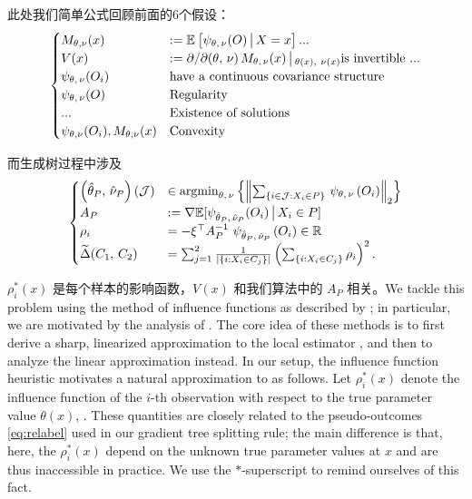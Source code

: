 \documentclass[aos]{imsart}
\theoremstyle{plain}
\theoremstyle{definition}
\theoremstyle{remark}
\begin{document}
\begin{CJK}{UTF8}{gbsn}
此处我们简单公式回顾前面的6个假设：
\begin{equation*}
\begin{cases}
M_{\theta, \nu}(x) &:= \EE{\psi_{\theta, \, \nu}(O) \cond X = x} ... \\
V(x) &:= {\partial}/{\partial (\theta, \, \nu)} \, M_{\theta, \, \nu}(x) \cond_{\theta(x), \ \nu(x)} \text{is invertible ...} \\ 
\psi_{\theta, \, \nu}(O_i) &\text{have a continuous covariance structure} \\
\psi_{\theta, \, \nu}(O) &\text{Regularity} \\
... &\text{Existence of solutions} \\
\psi_{\theta, \nu}(O_i), M_{\theta, \nu}(x) &\text{Convexity}
\end{cases}
\end{equation*}

而生成树过程中涉及 
$$
\begin{cases}
\p{\htheta_P, \, \hnu_P}(\mathcal{J}) &\in \argmin_{\theta, \, \nu}  \cb{\Norm{\sum_{\cb{i\in\mathcal{J} : X_i \in P}} \, \psi_{\theta, \, \nu}\p{O_i}}_2} \\
A_P &:= \nabla \mathbb{E}[\psi_{\htheta_P, \, \hnu_P}(O_i) \cond X_i \in P] \\
\rho_i &= -\xi^\top A_P^{-1} \ \psi_{\htheta_P, \, \hnu_P}\p{O_i} \in \RR  \\
\tDelta(C_1, \, C_2) &=  \sum_{j = 1}^2\frac{1}{\abs{\cb{i : X_i \in C_j}}}\p{ \sum_{\cb{i : X_i \in C_j}} \rho_i}^2.
\end{cases}
$$


$\rho_i^*(x)$ 是每个样本的影响函数，$V(x)$ 和我们算法中的 $A_P$ 相关。We tackle this problem using the method of influence functions as described by \citet{hampel1974influence};
in particular, we are motivated by the analysis of \citet{newey1994kernel}. The core idea of these methods
is to first derive a sharp, linearized approximation to the local estimator , and
then to analyze the linear approximation instead.
In our setup, the influence function heuristic motivates a natural approximation 
to  as follows. Let $\rho_i^*(x)$ denote the influence function of the
$i$-th observation with respect to the true parameter value $\theta(x)$,
.
These quantities are closely related to the pseudo-outcomes \eqref{eq:relabel} used in our gradient tree
splitting rule; the main difference is that, here, the $\rho_i^*(x)$ depend on the unknown true
parameter values at $x$ and are thus inaccessible in practice. We use the $*$-superscript to remind ourselves
of this fact.



\end{CJK}
\end{document}
